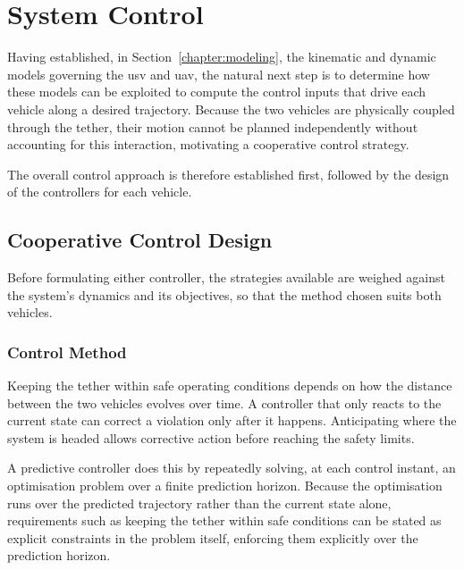 
\section{System Control}
\label{sec:system_control}
\label{chapter:control}

Having established, in Section~\ref{chapter:modeling}, the kinematic and dynamic models governing the \gls{usv} and \gls{uav}, the natural next step is to determine how these models can be exploited to compute the control inputs that drive each vehicle along a desired trajectory. Because the two vehicles are physically coupled through the tether, their motion cannot be planned independently without accounting for this interaction, motivating a cooperative control strategy.

The overall control approach is therefore established first, followed by the design of the controllers for each vehicle.

\subsection{Cooperative Control Design}
\label{sec:ctrl_architecture}
Before formulating either controller, the strategies available are weighed against the system's dynamics and its objectives, so that the method chosen suits both vehicles.

\subsubsection{Control Method}
\label{sec:ctrl_method}

Keeping the tether within safe operating conditions depends on how the distance between the two vehicles evolves over time. A controller that only reacts to the current state can correct a violation only after it happens. Anticipating where the system is headed allows corrective action before reaching the safety limits.

A predictive controller does this by repeatedly solving, at each control instant, an optimisation problem over a finite prediction horizon. Because the optimisation runs over the predicted trajectory rather than the current state alone, requirements such as keeping the tether within safe conditions can be stated as explicit constraints in the problem itself, enforcing them explicitly over the prediction horizon.

